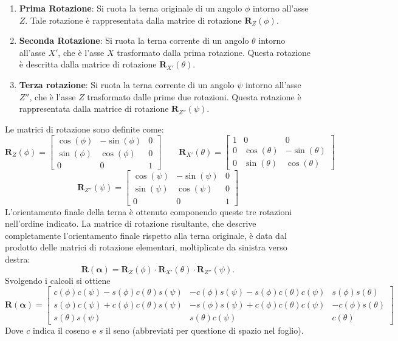 ﻿\documentclass[11pt, a4paper]{article}
\begin{document}
\begin{enumerate}
    \item \textbf{Prima Rotazione}: Si ruota la terna originale di un angolo $\phi$ intorno all'asse $Z$. Tale rotazione è rappresentata dalla matrice di rotazione $\mathbf{R}_Z(\phi)$.

    \item \textbf{Seconda Rotazione}: Si ruota la terna corrente di un angolo $\theta$ intorno all'asse $X'$, che è l'asse $X$ trasformato dalla prima rotazione. Questa rotazione è descritta dalla matrice di rotazione $\mathbf{R}_{X'}(\theta)$.

    \item \textbf{Terza rotazione}: Si ruota la terna corrente di un angolo $\psi$ intorno all'asse $Z''$, che è l'asse $Z$ trasformato dalle prime due rotazioni. Questa rotazione è rappresentata dalla matrice di rotazione $\mathbf{R}_{Z''}(\psi)$.
\end{enumerate}
Le matrici di rotazione sono definite come:
\[
    \mathbf{R}_{Z}(\phi) =
    \begin{bmatrix}
        \cos(\phi) & -\sin(\phi) & 0 \\
        \sin(\phi) & \cos(\phi) & 0 \\
        0 & 0 & 1
    \end{bmatrix}
    \qquad
    \mathbf{R}_{X'}(\theta) =
    \begin{bmatrix}
    1 & 0 & 0 \\
    0 & \cos(\theta) & -\sin(\theta) \\
    0 & \sin(\theta) & \cos(\theta)
    \end{bmatrix}
\]
\[
    \mathbf{R}_{Z''}(\psi) =
    \begin{bmatrix}
        \cos(\psi) & -\sin(\psi) & 0 \\
        \sin(\psi) & \cos(\psi) & 0 \\
        0 & 0 & 1
    \end{bmatrix}
\]
\newpage
L'orientamento finale della terna è ottenuto componendo queste tre rotazioni nell'ordine indicato. La matrice di rotazione risultante, che descrive completamente l'orientamento finale rispetto alla terna originale, è data dal prodotto delle matrici di rotazione elementari, moltiplicate da sinistra verso destra:
\[
\mathbf{R}(\boldsymbol{\alpha}) = \mathbf{R}_Z(\phi) \cdot \mathbf{R}_{X'}(\theta) \cdot \mathbf{R}_{Z''}(\psi).
\]
Svolgendo i calcoli si ottiene
\[
    \mathbf{R}(\boldsymbol{\alpha}) =
    \begin{bmatrix}
        c(\phi)c(\psi) - s(\phi)c(\theta)s(\psi) &
        -c(\phi)s(\psi) - s(\phi)c(\theta)c(\psi) &
        s(\phi)s(\theta) \\

        s(\phi)c(\psi) + c(\phi)c(\theta)s(\psi) &
        -s(\phi)s(\psi) + c(\phi)c(\theta)c(\psi) &
        -c(\phi)s(\theta) \\

        s(\theta)s(\psi) &
        s(\theta)c(\psi) &
        c(\theta)
    \end{bmatrix}
\]
Dove $c$ indica il coseno e $s$ il seno (abbreviati per questione di spazio nel foglio).
\end{document}
